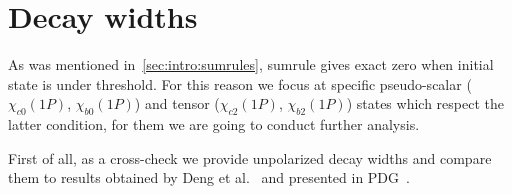 \chapter{Decay widths}

As was mentioned in~\cref{sec:intro:sumrules}, sumrule gives exact zero when initial state is under threshold. For this reason we focus at specific pseudo-scalar ($\chi_{c0}(1P)$, $\chi_{b0}(1P)$) and tensor ($\chi_{c2}(1P)$, $\chi_{b2}(1P)$) states which respect the latter condition, for them we are going to conduct further analysis.

First of all, as a cross-check we provide unpolarized decay widths and compare them to results obtained by Deng et al.~\cite{deng-charm,deng-bot} and presented in PDG~\cite{pdg}. 
